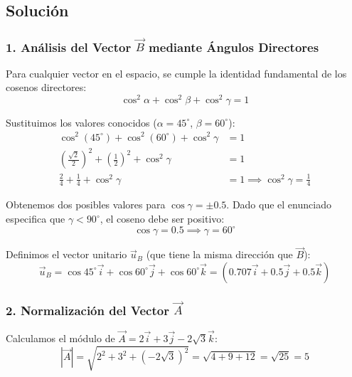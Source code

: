 \documentclass[12pt, a4paper]{article}
\begin{document}
\subsection*{Solución}

\subsubsection*{1. Análisis del Vector $\vec{B}$ mediante Ángulos Directores}
Para cualquier vector en el espacio, se cumple la identidad fundamental de los cosenos directores:
\begin{equation} \label{eq:identidad_directores}
    \cos^2 \alpha + \cos^2 \beta + \cos^2 \gamma = 1
\end{equation}

Sustituimos los valores conocidos ($\alpha = 45^\circ$, $\beta = 60^\circ$):
\begin{align*}
    \cos^2(45^\circ) + \cos^2(60^\circ) + \cos^2 \gamma &= 1 \\
    \left( \frac{\sqrt{2}}{2} \right)^2 + \left( \frac{1}{2} \right)^2 + \cos^2 \gamma &= 1 \\
    \frac{2}{4} + \frac{1}{4} + \cos^2 \gamma &= 1 \implies \cos^2 \gamma = \frac{1}{4}
\end{align*}

Obtenemos dos posibles valores para $\cos \gamma = \pm 0.5$. Dado que el enunciado especifica que $\gamma < 90^\circ$, el coseno debe ser positivo:
\begin{equation*}
    \cos \gamma = 0.5 \implies \gamma = 60^\circ
\end{equation*}

Definimos el vector unitario $\vec{u}_B$ (que tiene la misma dirección que $\vec{B}$):
\begin{equation*}
    \vec{u}_B = \cos 45^\circ \vec{i} + \cos 60^\circ \vec{j} + \cos 60^\circ \vec{k} = (0.707\vec{i} + 0.5\vec{j} + 0.5\vec{k})
\end{equation*}

\subsubsection*{2. Normalización del Vector $\vec{A}$}
Calculamos el módulo de $\vec{A} = 2\vec{i} + 3\vec{j} - 2\sqrt{3}\vec{k}$:
\begin{equation*}
    |\vec{A}| = \sqrt{2^2 + 3^2 + (-2\sqrt{3})^2} = \sqrt{4 + 9 + 12} = \sqrt{25} = 5
\end{equation*}
\end{document}
